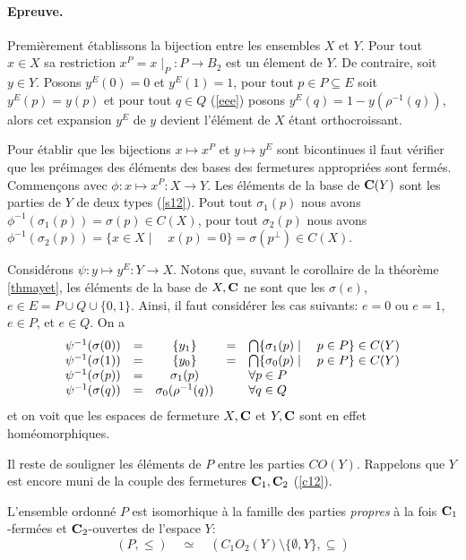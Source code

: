 \paragraph{Epreuve.} Premi\`erement \'etablissons la bijection 
entre les ensembles $X$ et $Y$. Pour tout $x\in X$ sa restriction 
$x^P=x\mid_P:P\to B_2$ est un \'element de $Y$. De contraire, 
soit $y\in Y$. Posons $y^E(0)=0$ et $y^E(1)=1$, pour tout $p\in 
P\subseteq E$ soit $y^E(p)=y(p)$ et pour tout $q\in Q$ (\ref{eee}) 
posons $y^E(q)=1-y(\rho^{-1}(q))$, alors cet expansion $y^E$ de 
$y$ devient l'\'el\'ement de $X$ \'etant orthocroissant. 

Pour \'etablir que les bijections $x\mapsto x^P$ et 
$y\mapsto y^E$ sont bicontinues il faut v\'erifier que les 
pr\'eimages des \'el\'ements des bases des fermetures 
appropri\'ees sont ferm\'es. Commen\c cons avec $\phi:x\mapsto 
x^P:X\to Y$.  Les \'el\'ements de la base de ${\bf C}(Y)$ sont les 
parties de $Y$ de deux types (\ref{s12}). Pout tout $\sigma_1(p)$ 
nous avons \( \phi^{-1}(\sigma_1(p))=\sigma(p)\in C(X) \), pour 
tout $\sigma_2(p)$ nous avons \( \phi^{-1}(\sigma_2(p))=\{x\in 
X\mid\quad x(p)=0\}=\sigma(p^\perp)\in C(X) \). 

Consid\'erons $\psi:y\mapsto y^E:Y\to X$. Notons que, suvant le 
corollaire de la th\'eor\`eme \ref{thmayet}, les \'el\'ements de la 
base de $X,{\bf C}$ ne sont que les $\sigma(e)$, $e\in E=P\cup Q\cup 
\{0,1\}$. Ainsi, il faut consid\'erer les cas suivants: $e=0$ 
ou $e=1$, $e\in P$, et $e\in Q$. On a 
\begin{equation} 
\begin{array}{rcccl}
\psi^{-1}(\sigma(0))&=&
\{y_1\}&=&
\bigcap\{\sigma_1(p)\mid\quad p\in P\}\in C(Y)\cr
\psi^{-1}(\sigma(1))&=&
\{y_0\}&=&
\bigcap\{\sigma_0(p)\mid\quad p\in P\}\in C(Y) \cr
\psi^{-1}(\sigma(p))&=&\sigma_1(p)&&\forall p\in P \cr 
 \psi^{-1}(\sigma(q))&=&\sigma_0(\rho^{-1}(q))&&\forall q\in Q 
\end{array} \label{hom} 
\end{equation} 
et on voit que les es\-pa\-ces de fer\-me\-tu\-re $X,{\bf C}$ et $Y,{\bf C}$ 
sont en effet ho\-m\'e\-o\-mor\-phi\-ques.  \endproof 

Il reste de souligner les \'el\'ements de $P$ entre les parties 
$CO(Y)$. Rappelons que $Y$ est encore muni de la couple des 
fermetures ${\bf C}_1,{\bf C}_2$ (\ref{c12}). 

\begin{lemma} L'ensemble ordonn\'e $P$ est isomorhique \`a la 
famille des parties {\em propres} \`a la fois ${\bf C}_1$-ferm\'ees et 
${\bf C}_2$-ouvertes de l'espace $Y$:  
\[ (P,\le)\quad\simeq\quad (C_1O_2(Y)\setminus\{\emptyset, 
Y\},\subseteq) \] 
\end{lemma} 


